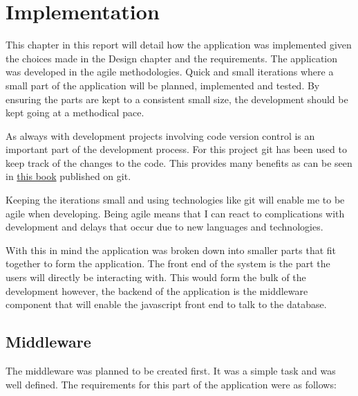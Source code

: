 \chapter{Implementation}\label{implementation}

This chapter in this report will detail how the application was
implemented given the choices made in the Design chapter and the
requirements. The application was developed in the agile methodologies.
Quick and small iterations where a small part of the application will be
planned, implemented and tested. By ensuring the parts are kept to a
consistent small size, the development should be kept going at a
methodical pace.

As always with development projects involving code version control is an
important part of the development process. For this project git has been
used to keep track of the changes to the code. This provides many
benefits as can be seen in
\href{https://books.google.co.uk/books?hl=en\&lr=\&id=aM7-Oxo3qdQC\&oi=fnd\&pg=PR3\&dq=version+control+software\&ots=38zcOCRfo9\&sig=RrjwXCtjK_7I4AtQZiOWj5wSo5Q\#v=onepage\&q\&f=false}{this
book} published on git.

Keeping the iterations small and using technologies like git will enable
me to be agile when developing. Being agile means that I can react to
complications with development and delays that occur due to new
languages and technologies.

With this in mind the application was broken down into smaller parts
that fit together to form the application. The front end of the system
is the part the users will directly be interacting with. This would form
the bulk of the development however, the backend of the application is
the middleware component that will enable the javascript front end to
talk to the database.

\section{Middleware}\label{middleware}

The middleware was planned to be created first. It was a simple task and
was well defined. The requirements for this part of the application were
as follows:

